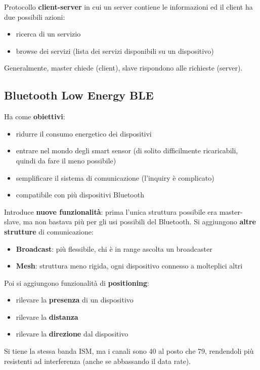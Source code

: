 Protocollo \textbf{client-server} in cui un server contiene le informazioni ed il client ha due possibili azioni:
\begin{itemize}
	\item ricerca di un servizio
	\item browse dei servizi (lista dei servizi disponibili su un dispositivo)
\end{itemize}
Generalmente, master chiede (client), slave rispondono alle richieste (server).\\

\newpage

\subsection{Bluetooth Low Energy BLE}

Ha come \textbf{obiettivi}:
\begin{itemize}
	\item ridurre il consumo energetico dei dispositivi
	\item entrare nel mondo degli smart sensor (di solito difficilmente ricaricabili, quindi da fare il meno possibile)
	\item semplificare il sistema di comunicazione (l'inquiry è complicato)
	\item compatibile con più dispositivi Bluetooth
\end{itemize} 

Introduce \textbf{nuove funzionalità}: prima l'unica struttura possibile era master-slave, ma non bastava più per gli usi possibili del Bluetooth. Si aggiungono \textbf{altre strutture} di comunicazione:
\begin{itemize}
	\item \textbf{Broadcast}: più flessibile, chi è in range ascolta un broadcaster
	\item \textbf{Mesh}: struttura meno rigida, ogni dispositivo connesso a molteplici altri
\end{itemize}

Poi si aggiungono funzionalità di \textbf{positioning}: 
\begin{itemize}
	\item rilevare la \textbf{presenza} di un dispositivo
	\item rilevare la \textbf{distanza}
	\item rilevare la \textbf{direzione} dal dispositivo
\end{itemize}

Si tiene la stessa banda ISM, ma i canali sono 40 al posto che 79, rendendoli più resistenti ad interferenza (anche se abbassando il data rate). \\

